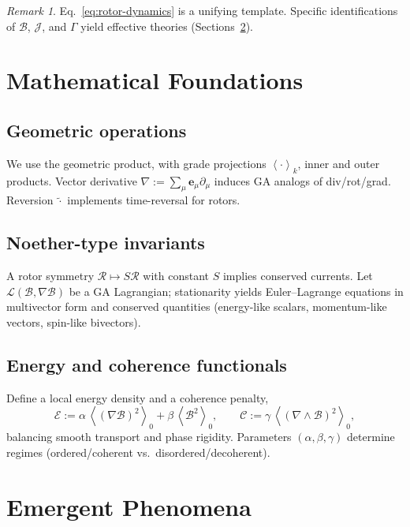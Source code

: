 \documentclass[11pt,a4paper]{article}
\newcommand{\e}{\mathbf{e}}
\newcommand{\grade}[2]{\left\langle #1 \right\rangle_{#2}}
\newcommand{\scal}[1]{\grade{#1}{0}}
\newcommand{\rev}[1]{\widetilde{#1}}           %
\newcommand{\Rotor}{\mathcal{R}}
\newcommand{\Biv}{\mathcal{B}}
\newcommand{\D}{\nabla}                        %
\theoremstyle{definition}
\theoremstyle{plain}
\theoremstyle{remark}
\newtheorem{remark}{Remark}
\begin{document}
\begin{remark}
Eq.~\eqref{eq:rotor-dynamics} is a unifying template. Specific identifications of $\Biv$, $\mathcal{J}$, and $\Gamma$ yield effective theories (Sections~\ref{sec:emergent}).
\end{remark}

\vspace{1em}

\section{Mathematical Foundations}
\subsection{Geometric operations}
We use the geometric product, with grade projections $\grade{\cdot}{k}$, inner and outer products. Vector derivative $\D := \sum_\mu \e_\mu \partial_\mu$ induces GA analogs of div/rot/grad. Reversion $\rev{\cdot}$ implements time-reversal for rotors.

\subsection{Noether-type invariants}
A rotor symmetry $\Rotor\mapsto S\Rotor$ with constant $S$ implies conserved currents. Let $\mathcal{L}(\Biv,\D\Biv)$ be a GA Lagrangian; stationarity yields Euler--Lagrange equations in multivector form and conserved quantities (energy-like scalars, momentum-like vectors, spin-like bivectors).

\subsection{Energy and coherence functionals}
Define a local energy density and a coherence penalty,
\begin{equation}
  \mathcal{E} := \alpha\, \scal{(\D \Biv)^2} + \beta\, \scal{\Biv^2}, 
  \qquad 
  \mathcal{C} := \gamma\, \scal{(\D\wedge\Biv)^2},
\end{equation}
balancing smooth transport and phase rigidity. Parameters $(\alpha,\beta,\gamma)$ determine regimes (ordered/coherent vs.\ disordered/decoherent).

\vspace{1em}

\section{Emergent Phenomena}\label{sec:emergent}
\end{document}

